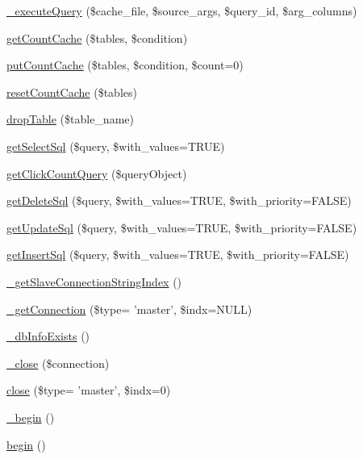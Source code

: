 \begin{DoxyCompactItemize}
\item 
\hyperlink{classDB_ae3febd3b468fd75f9606f247489d5512}{\+\_\+execute\+Query} (\$cache\+\_\+file, \$source\+\_\+args, \$query\+\_\+id, \$arg\+\_\+columns)
\item 
\hyperlink{classDB_af638cf3ae9ad406810b2f8c2d322225c}{get\+Count\+Cache} (\$tables, \$condition)
\item 
\hyperlink{classDB_a90771d4eaa0ff60a1ddbeb338f2ab801}{put\+Count\+Cache} (\$tables, \$condition, \$count=0)
\item 
\hyperlink{classDB_a8167fd227a1955f8300c0d0e70dd9d9e}{reset\+Count\+Cache} (\$tables)
\item 
\hyperlink{classDB_a63a3a5bdc8e30e1cee37cefddd5ce8de}{drop\+Table} (\$table\+\_\+name)
\item 
\hyperlink{classDB_a5324aefa22399846c6a7fb8afeb6e55d}{get\+Select\+Sql} (\$query, \$with\+\_\+values=T\+R\+U\+E)
\item 
\hyperlink{classDB_a75a6b61801ef6ed2bbf092f1333a8ccd}{get\+Click\+Count\+Query} (\$query\+Object)
\item 
\hyperlink{classDB_aeb58bf0e323895cdc7eda34f09254ed6}{get\+Delete\+Sql} (\$query, \$with\+\_\+values=T\+R\+U\+E, \$with\+\_\+priority=F\+A\+L\+S\+E)
\item 
\hyperlink{classDB_ac467d003673def17f4d397e3f25bcf84}{get\+Update\+Sql} (\$query, \$with\+\_\+values=T\+R\+U\+E, \$with\+\_\+priority=F\+A\+L\+S\+E)
\item 
\hyperlink{classDB_a2664c0b5ba2bc70d02504ebf343e913e}{get\+Insert\+Sql} (\$query, \$with\+\_\+values=T\+R\+U\+E, \$with\+\_\+priority=F\+A\+L\+S\+E)
\item 
\hyperlink{classDB_a8dc4e826557c3de0d49adf7e6112bfea}{\+\_\+get\+Slave\+Connection\+String\+Index} ()
\item 
\hyperlink{classDB_a52b496d073cecfd2ca6e14897b559819}{\+\_\+get\+Connection} (\$type= 'master', \$indx=N\+U\+L\+L)
\item 
\hyperlink{classDB_a3bbfb0e7579e8d6fc27a20c1219bb693}{\+\_\+db\+Info\+Exists} ()
\item 
\hyperlink{classDB_a8c161612a558f47fb008dec4b46ee05c}{\+\_\+close} (\$connection)
\item 
\hyperlink{classDB_a99ab404981e46ae5b48e11ce46290500}{close} (\$type= 'master', \$indx=0)
\item 
\hyperlink{classDB_ab081086c9f44c12dce30d78e00141986}{\+\_\+begin} ()
\item 
\hyperlink{classDB_a41aea6b3a6787467fcfd16d28a302c54}{begin} ()
\item 

\end{DoxyCompactItemize}
